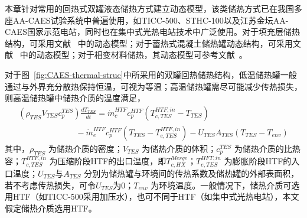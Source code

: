 本章针对常用的回热式双罐液态储热方式建立动态模型，该类储热方式已在我国多座AA-CAES试验系统中普遍使用，如TICC-500\cite{TICC-15}、STHC-100\cite{ST-CAES-17}以及江苏金坛AA-CAES国家示范电站\cite{CAES-Review-17-Rui-salt}，同时也在集中式光热电站技术中广泛使用\cite{TES-CSP-review-13}。对于填充层储热结构，可采用文献~ 中的动态模型；对于蓄热式混凝土储热罐动态结构，可采用文献~ 中的动态模型；对于相变材料储热，其动态模型可参考文献~。

对于图~\ref{fig:CAES-thermal-struc}中所采用的双罐回热储热结构，低温储热罐一般通过与外界充分散热保持恒温，可视为等温；高温储热罐需尽可能减少传热损失，则高温储热罐中储热介质的温度满足，
\begin{equation}
\label{equ:TES-HTF-temp}
\begin{array}{l}
({{\rho _{TES}}{V_{TES}}c_p^{TES}})\frac{{d{T_{TES}}}}{{dt}} = \dot m_c^{HTF}c_p^{HTF}({T_{c,TES}^{HTF,in} - {T_{TES}}})\\
\;\;\;\;\;\;\;\;\;\;\;\;\;\;\;\;\;\;\;\;\;\;\;\;\; - \dot m_e^{HTF}c_p^{HTF}({{T_{TES}} - T_{e,TES}^{HTF,in}}) - {U_{TES}}{A_{TES}}({{T_{TES}} - {T_{env}}})
\end{array}
\end{equation}
其中，${\rho _{TES}}$ 为储热介质的密度；${V_{TES}}$ 为储热介质的体积；$c_p^{TES}$ 为储热介质的比热容；$T_{c,TES}^{HTF,in}$ 为压缩阶段HTF的出口温度，即$T_{c,HX}^{Merge}$；$T_{e,TES}^{HFT,in}$ 为膨胀阶段HTF的入口温度；${U_{TES}}$与${A_{TES}}$ 分别为储热罐与环境间的传热系数及储热罐的外部表面积，若不考虑传热损失，可令${U_{TES}}$为0；$T_{env}$ 为环境温度。一般情况下，储热介质可选用HTF（如TICC-500采用加压水），也可不同于HTF（如集中式光热电站），本文假定储热介质选用HTF。

